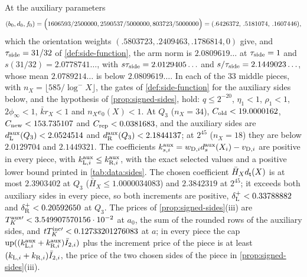 \begin{certificate}\label{cert:record:matching}
At the auxiliary parameters
\[
 (b_0,d_0,f_0)=\Bigl(\frac{1606593}{2500000},\frac{2590537}{5000000},
 \frac{803723}{5000000}\Bigr)=(.6426372,\,.5181074,\,.1607446),
\]
which the orientation weights $(.5803723,.2409463,.1786814,0)$ give, and
$\tside=31/32$ of \cref{def:side-function}, the arm norm is
$2.0809619\ldots$ at $\tside=1$ and $s(31/32)=2.0778741\ldots$, with
$s\tside=2.0129405\ldots$ and $s/\tside=2.1449023\ldots$, whose mean
$2.0789214\ldots$ is below $2.0809619\ldots$. In each of the $33$ middle pieces,
with $n_X=\lfloor585/\log^-X\rfloor$, the gates of
\cref{def:side-function} for the auxiliary sides below, and the
hypothesis of \cref{prop:signed-sides}, hold: $q\le2^{-20}$, $\eta_1<1$, $\rho_1<1$,
$2\phi_\infty<1$, $\bar kr_X<1$ and $n_Xe_0(X)<1$. At $Q_3$ ($n_X=34$),
$C_{\rm old}<19.0000162$, $C_{\rm new}<153.735107$ and $C_{\rm rep}<0.0381683$, and
the auxiliary sides are $d^{\rm aux}_{\rm L}(Q_3)<2.0524514$ and
$d^{\rm aux}_{\rm R}(Q_3)<2.1844137$; at $2^{45}$ ($n_X=18$) they are below
$2.0129704$ and $2.1449321$. The coefficients
$k^{\rm aux}_{s,i}=w_{{\rm D},i}d^{\rm aux}_s(X_i)-v_{{\rm D},i}$ are positive in every
piece, with $k^{\rm aux}_{{\rm L},i}\le k^{\rm aux}_{{\rm R},i}$,
with the exact selected values and a positive lower bound printed in
\cref{tab:data:sides}. The chosen coefficient
$\bar H_Xd_\tlaw(X)$ is at most $2.3903402$ at $Q_3$ ($\bar H_X\le1.0000034083$)
and $2.3842319$ at $2^{45}$; it exceeds both auxiliary sides in every piece, so
both increments are positive, $\delta^+_{\rm L}<0.33788882$ and
$\delta^+_{\rm R}<0.20592650$ at $Q_3$. The prices of
\cref{prop:signed-sides}(iii) are $T^{\rm aux\prime}_K<3.549907570156\cdot10^{-2}$ at
$a_0$, the sum of the rounded rows of the auxiliary sides, and
$tT^{\rm inc\prime}_K<0.12733201276083$ at $a$; in every piece the cap
$\operatorname{up}((k^{\rm aux}_{{\rm L},i}+k^{\rm aux}_{{\rm R},i})\bar I_{2,i})$ plus the
increment price of the piece is at least
$(k_{{\rm L},i}+k_{{\rm R},i})\bar I_{2,i}$, the price of the two
chosen sides of the piece in \cref{prop:signed-sides}(iii).
\end{certificate}

